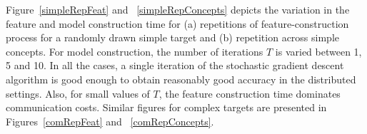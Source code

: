 \begin{description}
        Figure~\ref{simpleRepFeat} and ~\ref{simpleRepConcepts} depicts the variation in the feature and model construction time for (a) repetitions of feature-construction process for a randomly drawn simple target and (b) repetition across simple concepts. For model construction, the number of iterations $T$ is varied between 1, 5 and 10. In all the cases, a single iteration of the stochastic gradient descent algorithm is good enough to obtain reasonably good accuracy in the distributed settings. Also, for small values of $T$, the feature construction time dominates communication costs. Similar figures for complex targets are presented in Figures~\ref{comRepFeat} and ~\ref{comRepConcepts}. 
        
%

        
 

\end{description}
